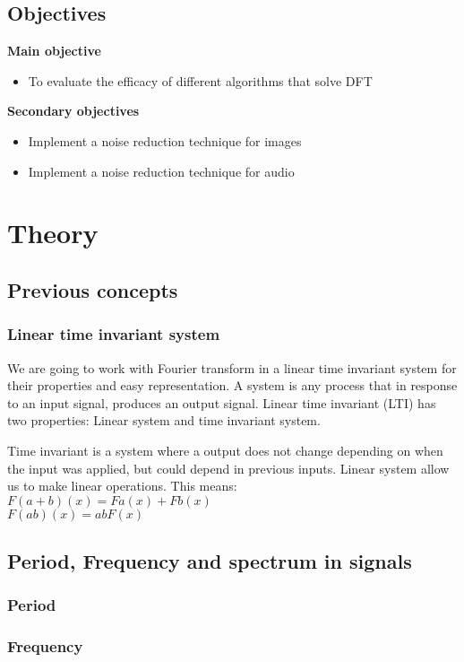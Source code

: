 \subsection{Objectives}

\textbf{Main objective}
\begin{itemize}
    \item To evaluate the efficacy of different algorithms that solve DFT
\end{itemize}

\noindent \textbf{Secondary objectives}
\begin{itemize}
    \item Implement a noise reduction technique for images
    \item Implement a noise reduction technique for audio 
\end{itemize}


\section{Theory}
\subsection{Previous concepts}
\subsubsection{Linear time invariant system}
We are going to work with Fourier transform in a linear time invariant system for their properties and easy representation.   
A system is any process that in response to an input signal, produces an output signal. Linear time invariant (LTI) has two properties: Linear system and time invariant system.

Time invariant is a system where a output does not change depending on when the input was applied, but could depend in previous inputs. Linear system allow us to make linear operations. This means: \\ 
$F(a+b)(x) = Fa(x) + Fb(x) $\\
$F(ab)(x) = abF(x)$


\subsection{Period, Frequency and spectrum in signals}
\subsubsection{Period}
\subsubsection{Frequency}

